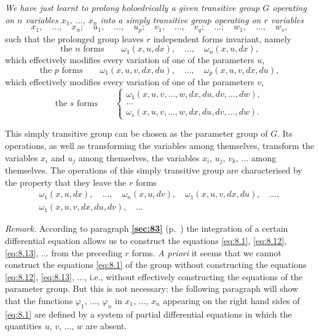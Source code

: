 \documentclass[leqno,11pt]{book}
\makeatletter
\numberwithin{equation}{chapter}
\theoremstyle{shape1}
\theoremstyle{shapesmall}
\let\old@phi\phi
\let\old@varphi\varphi
\let\phi\old@varphi
\let\varphi\old@phi
\newcommand{\fsref}[1]{{\rm\textsection\textbf{\ref{sec:#1}}}}
\newcommand{\somespace}{\vspace{9pt}}
\makeatother
\begin{document}
\emph{We have just learnt to prolong holoedrically a given transitive group $G$ operating on $n$ variables $x_{1}$, $\dots$, $x_{n}$ into a simply transitive group operating on $r$ variables}
\[
x_{1},\quad\dots,\quad x_{n};\quad u_{1},\quad\dots,\quad u_{p};\quad v_{1},\quad\dots,\quad v_{q};\quad\dots;\quad w_{1},\quad \dots,\quad w_{s},
\]
such that the prolonged group leaves $r$ independent forms invariant, namely 
\[
\text{the $n$ forms}\qquad\omega_{1}(x,u,dx),\quad\dots,\quad\omega_{n}(x,u,dx),
\]
which effectively modifies every variation of one of the parameters $u$,
\[
\text{the $p$ forms}\qquad\omega_{1}(x,u,v,dx,du),\quad\dots,\quad\omega_{p}(x,u,v,dx,du),
\]
which effectively modifies every variation of one of the parameters $v$,
\[
\text{the $s$ forms}\qquad\left\{
  \begin{gathered}
    \omega_{1}(x,u,v,\dots,w,dx,du,dv,\dots,dw),\\
    \dots\\
    \omega_{s}(x,u,v,\dots,w,dx,du,dv,\dots,dw).
  \end{gathered}
\right.
\]

\somespace

This simply transitive group can be chosen as the parameter group of $G$. Its operations, as well as transforming the variables among themselves, transform the variables $x_{i}$ and $u_{j}$ among themselves, the variables $x_{i}$, $u_{j}$, $v_k$, $\dots$ among themselves. The operations of this simply transitive group are characterised by the property that they leave the $r$ forms
\begin{gather*}
  \omega_{1}(x,u,dx),\quad\dots,\quad\omega_{n}(x,u,dv),\quad\omega_{1}(x,u,v,dx,du),\quad\dots,\\
  \omega_{1}(x,u,v,dx,du,dv),\quad\dots
\end{gather*}

\somespace

\emph{Remark.} According to paragraph \fsref{83} (p.~\pageref{sec:83}) the integration of a certain differential equation allows us to construct the equations \eqref{eq:8.1}, \eqref{eq:8.12}, \eqref{eq:8.13}, $\dots$ from the preceding $r$ forms. \emph{A priori} it seems that we cannot construct the equations \eqref{eq:8.1} of the group without constructing the equations \eqref{eq:8.12}, \eqref{eq:8.13}, $\dots$, i.e., without effectively constructing the equations of the parameter group. But this is not necessary: the following paragraph will show that the functions $\phi_{1}$, $\dots$, $\phi_{n}$ in $x_{1}$, $\dots$, $x_{n}$ appearing on the right hand sides of \eqref{eq:8.1} are defined by a system of partial differential equations in which the quantities $u$, $v$, $\dots$, $w$ are absent.
\end{document}
